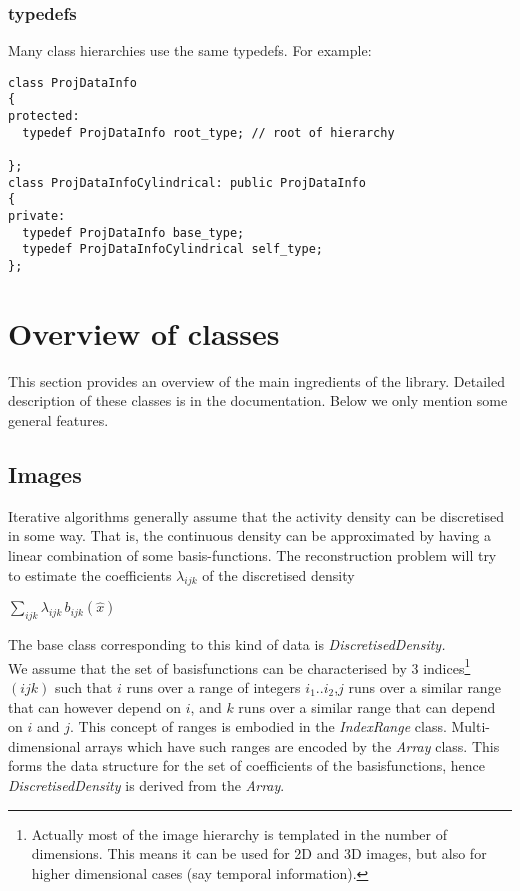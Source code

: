 \documentclass{article}
\begin{document}
\subsubsection{typedefs}
Many class hierarchies use the same typedefs. For example:
\begin{verbatim}
class ProjDataInfo
{
protected:
  typedef ProjDataInfo root_type; // root of hierarchy
  
};
class ProjDataInfoCylindrical: public ProjDataInfo
{
private:
  typedef ProjDataInfo base_type;
  typedef ProjDataInfoCylindrical self_type;
};
\end{verbatim}

\section{
Overview of classes}

This section provides an overview of the main ingredients of 
the library. Detailed description of these classes is in the documentation. 
Below we only mention some general features.



\subsection{
Images}

Iterative algorithms generally assume that the activity density 
can be discretised in some way. That is, the continuous density 
can be approximated by having a linear combination of some basis-functions. 
The reconstruction problem will try to estimate the coefficients $\lambda_{ijk}$ of 
the discretised density


$\sum_{ ijk}\lambda _{ijk} \,b_{ijk} (\widehat{x})  $

The base class corresponding to this kind of data is \textit{DiscretisedDensity.}\\
We assume that the set of basisfunctions can be characterised 
by 3 indices\footnote{{\small Actually most of the image hierarchy is 
templated in the number of dimensions. This means it can be used 
for 2D and 3D images, but also for higher dimensional cases (say 
temporal information).}} $(ijk)$ such that $i$ runs over a 
range of integers $i_1..i_2$,$j$ runs over a 
similar range that can however depend on $i$, and $k$ runs 
over a similar range that can depend on $i$ and $j$. 
This 
concept of ranges is embodied in the \textit{IndexRange} class. Multi-dimensional 
arrays which have such ranges are encoded by the \textit{Array} class. 
This forms the data structure for the set of coefficients of 
the basisfunctions, hence \textit{DiscretisedDensity} is derived from 
the \textit{Array}.
\end{document}
